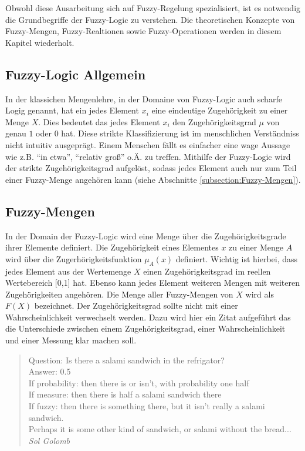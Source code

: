 \documentclass[12pt,a4paper,bibliography=totocnumbered,listof=totocnumbered]{scrartcl}
\theoremstyle{Umgebung}
\begin{document}
Obwohl diese Ausarbeitung sich auf Fuzzy-Regelung spezialisiert, ist es notwendig die Grundbegriffe der Fuzzy-Logic zu verstehen. Die theoretischen Konzepte von Fuzzy-Mengen, Fuzzy-Realtionen sowie Fuzzy-Operationen werden in diesem Kapitel wiederholt.

\subsection{Fuzzy-Logic Allgemein}

In der klassichen Mengenlehre, in der Domaine von Fuzzy-Logic auch scharfe Logig genannt, hat ein jedes Element $x_i$ eine eindeutige Zugehörigkeit zu einer Menge $X$. Dies bedeutet das jedes Element $x_i$ den Zugehörigkeitsgrad $\mu$ von genau $1$ oder $0$ hat. Diese strikte Klassifizierung ist im menschlichen Verständniss nicht intuitiv ausgeprägt. Einem Menschen fällt es einfacher eine wage Aussage wie z.B. \enquote{in etwa}, \enquote{relativ groß} o.Ä. zu treffen. Mithilfe der Fuzzy-Logic wird der strikte Zugehörigkeitsgrad aufgelöst, sodass jedes Element auch nur zum Teil einer Fuzzy-Menge angehören kann (siehe Abschnitte \ref{subsection:Fuzzy-Mengen}).

\label{subsection:Fuzzy-Mengen}
\subsection{Fuzzy-Mengen}

In der Domain der Fuzzy-Logic wird eine Menge über die Zugehörigkeitsgrade ihrer Elemente definiert. Die Zugehörigkeit eines Elementes $x$ zu einer Menge $A$ wird über die Zugerhörigkeitsfunktion $\mu_A(x)$ definiert. Wichtig ist hierbei, dass jedes Element aus der Wertemenge $X$ einen Zugehörigkeitsgrad im reellen Wertebereich [0,1] hat. Ebenso kann jedes Element weiteren Mengen mit weiteren Zugehörigkeiten angehören. Die Menge aller Fuzzy-Mengen von $X$ wird als $F(X)$ bezeichnet. Der Zugehörigkeitsgrad sollte nicht mit einer Wahrscheinlichkeit verwechselt werden. Dazu wird hier ein Zitat aufgeführt das die Unterschiede zwischen einem Zugehörigkeitsgrad, einer Wahrscheinlichkeit und einer Messung klar machen soll.

\begin{quote}
Question: Is there a salami sandwich in the refrigator? \\
Answer: 0.5 \\
If probability: then there is or isn’t, with probability one half \\
If measure: then there is half a salami sandwich there \\
If fuzzy: then there is something there, but it isn’t really a salami sandwich. \\
Perhaps it is some other kind of sandwich, or salami without the bread... \\
\emph{Sol Golomb}
\end{quote}
\end{document}
